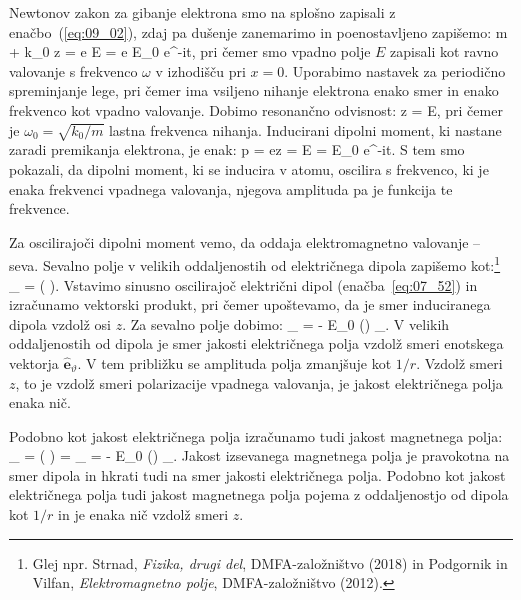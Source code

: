 Newtonov zakon za gibanje elektrona smo na splošno zapisali z enačbo~(\ref{eq:09_02}), 
zdaj pa dušenje zanemarimo in poenostavljeno zapišemo:
\beq
m  + k_0 z = e E = e E_0 e^{-i\omega t},
\label{eq:07_50}
\eeq
pri čemer smo vpadno polje $E$ zapisali kot ravno valovanje s frekvenco $\omega$ v
izhodišču pri $x=0$. 
Uporabimo nastavek za periodično spreminjanje lege, pri čemer ima vsiljeno 
nihanje elektrona enako smer in enako frekvenco kot vpadno valovanje. Dobimo resonančno odvisnost:
\beq
z = E,
\label{eq:07_51}
\eeq
pri čemer je $\omega_0 = \sqrt{k_0/m}$ lastna frekvenca nihanja.
Inducirani dipolni moment, ki nastane zaradi premikanja elektrona, 
je enak:
\beq
p = ez  =  E = 
E_0 e^{-i\omega t}.
\label{eq:07_52}
\eeq
S tem smo pokazali, da dipolni moment, ki se inducira v atomu, oscilira s frekvenco, 
ki je enaka frekvenci vpadnega valovanja, njegova amplituda pa je funkcija te frekvence.

Za oscilirajoči dipolni moment vemo, da oddaja elektromagnetno valovanje -- seva. 
Sevalno polje v velikih oddaljenostih od električnega dipola zapišemo 
kot:\footnote{Glej npr. Strnad, {\it Fizika, drugi del}, DMFA-založništvo (2018) in
Podgornik in Vilfan, {\it Elektromagnetno polje}, DMFA-založništvo (2012).}
\beq
{}_ = 
\left( \times {}\right)\times {}.
\label{eq:07_12}
\eeq
Vstavimo sinusno oscilirajoč električni dipol (enačba~\ref{eq:07_52})
in izračunamo vektorski produkt, pri čemer upoštevamo, da je smer induciranega
dipola vzdolž osi $z$. Za sevalno polje dobimo:
\beq
{}_ = -
E_0
\sin \vartheta \left(\right) _\vartheta.
\label{eq:dipolE}
\eeq
V velikih oddaljenostih od dipola je smer jakosti električnega polja vzdolž smeri enotskega
vektorja $\hat{\mathbf{e}}_\vartheta$. V tem približku se amplituda polja zmanjšuje 
kot $1/r$. Vzdolž smeri $z$, to je vzdolž smeri polarizacije vpadnega valovanja, 
je jakost električnega polja enaka nič. 

Podobno kot jakost električnega polja izračunamo tudi jakost magnetnega polja:
\beq
{}_ = 
\left( \times {}\right) = 
_ = - 
E_0\sin \vartheta
\left(\right) _\varphi.
\label{eq:dipolH}
\eeq
Jakost izsevanega magnetnega polja je pravokotna na smer dipola in 
hkrati tudi na smer jakosti električnega polja. Podobno kot jakost
električnega polja tudi jakost magnetnega polja pojema z oddaljenostjo
od dipola kot $1/r$ in je enaka nič vzdolž smeri $z$.

